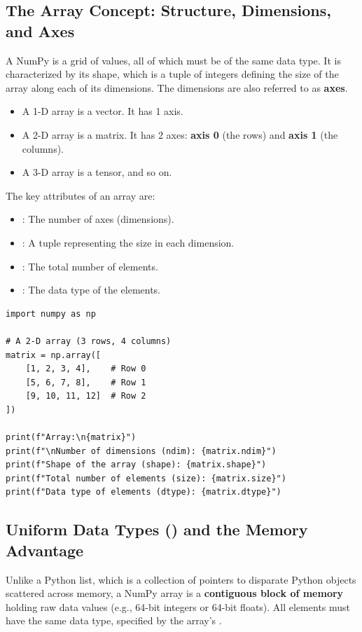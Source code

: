 \subsection{The Array Concept: Structure, Dimensions, and Axes}
\label{subsec:numpy_array_concept}
A NumPy  is a grid of values, all of which must be of the same data type. It is characterized by its shape, which is a tuple of integers defining the size of the array along each of its dimensions. The dimensions are also referred to as \textbf{axes}.

\begin{itemize}
    \item A 1-D array is a vector. It has 1 axis.
    \item A 2-D array is a matrix. It has 2 axes: \textbf{axis 0} (the rows) and \textbf{axis 1} (the columns).
    \item A 3-D array is a tensor, and so on.
\end{itemize}
The key attributes of an array are:
\begin{itemize}
    \item {}: The number of axes (dimensions).
    \item {}: A tuple representing the size in each dimension.
    \item {}: The total number of elements.
    \item {}: The data type of the elements.
\end{itemize}

\begin{example}
\text{ }\begin{verbatim}
import numpy as np

# A 2-D array (3 rows, 4 columns)
matrix = np.array([
    [1, 2, 3, 4],    # Row 0
    [5, 6, 7, 8],    # Row 1
    [9, 10, 11, 12]  # Row 2
])

print(f"Array:\n{matrix}")
print(f"\nNumber of dimensions (ndim): {matrix.ndim}")
print(f"Shape of the array (shape): {matrix.shape}")
print(f"Total number of elements (size): {matrix.size}")
print(f"Data type of elements (dtype): {matrix.dtype}")
\end{verbatim}
\end{example}

\subsection{Uniform Data Types () and the Memory Advantage}
\label{subsec:numpy_dtypes}
Unlike a Python list, which is a collection of pointers to disparate Python objects scattered across memory, a NumPy array is a \textbf{contiguous block of memory} holding raw data values (e.g., 64-bit integers or 64-bit floats). All elements must have the same data type, specified by the array's .

